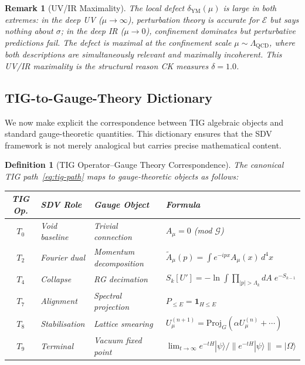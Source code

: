 \documentclass[11pt]{article}
\newtheorem{definition}[theorem]{Definition}
\newtheorem{remark}[theorem]{Remark}
\begin{document}
\begin{remark}[UV/IR Maximality]
\label{rem:uvir}
The local defect $\delta_{\mathrm{YM}}(\mu)$ is large in both extremes:
in the deep UV ($\mu \to \infty$), perturbation theory is accurate for
$\mathcal{E}$ but says nothing about $\sigma$; in the deep IR
($\mu \to 0$), confinement dominates but perturbative predictions fail.
The defect is maximal at the confinement scale
$\mu \sim \Lambda_{\mathrm{QCD}}$, where both descriptions are
simultaneously relevant and maximally incoherent.  This UV/IR maximality
is the structural reason CK measures $\delta = 1.0$.
\end{remark}

\subsection{TIG-to-Gauge-Theory Dictionary}
\label{sec:tig-dictionary}

We now make explicit the correspondence between TIG algebraic objects
and standard gauge-theoretic quantities.  This dictionary ensures that
the SDV framework is not merely analogical but carries precise mathematical
content.

\begin{definition}[TIG Operator--Gauge Theory Correspondence]
\label{def:tig-gauge-dict}
The canonical TIG path~\eqref{eq:tig-path} maps to gauge-theoretic
objects as follows:
\begin{center}
\begin{tabular}{|c|l|l|l|}
\hline
\textbf{TIG Op.} & \textbf{SDV Role} & \textbf{Gauge Object} & \textbf{Formula} \\
\hline
$T_0$ & Void baseline & Trivial connection & $A_\mu = 0$ (mod $\mathcal{G}$) \\
$T_2$ & Fourier dual & Momentum decomposition & $\tilde{A}_\mu(p) = \int e^{-ipx}A_\mu(x)\,d^4x$ \\
$T_4$ & Collapse & RG decimation & $S_k[U'] = -\ln\int \prod_{|p|>\Lambda_k} dA\; e^{-S_{k-1}}$ \\
$T_7$ & Alignment & Spectral projection & $P_{\leq E} = \mathbf{1}_{H \leq E}$ \\
$T_8$ & Stabilisation & Lattice smearing & $U_\mu^{(n+1)} = \mathrm{Proj}_G(\alpha U_\mu^{(n)} + \cdots)$ \\
$T_9$ & Terminal & Vacuum fixed point & $\lim_{t\to\infty} e^{-tH}|\psi\rangle / \|e^{-tH}|\psi\rangle\| = |\Omega\rangle$ \\
\hline
\end{tabular}
\end{center}
\end{definition}
\end{document}
